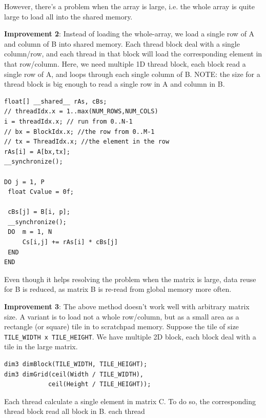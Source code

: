 However, there's a problem when the array is large, i.e. the whole array is
quite large to load all into the shared memory.

{\bf Improvement 2}: Instead of loading the whole-array, we
load a single row of A and column of B into shared memory. Each thread block
deal with a single column/row, and each thread in that block will load the
corresponding element in that row/column. Here, we need multiple 1D
thread block, each block read a single row of A, and loops through each single column of B.
NOTE: the size for a thread block is big enough to read a single row in A and
column in B.
\begin{lstlisting}
float[] __shared__ rAs, cBs;
// threadIdx.x = 1..max(NUM_ROWS,NUM_COLS)
i = threadIdx.x; // run from 0..N-1
// bx = BlockIdx.x; //the row from 0..M-1
// tx = ThreadIdx.x; //the element in the row
rAs[i] = A[bx,tx];
__synchronize();

DO j = 1, P
 float Cvalue = 0f;

 cBs[j] = B[i, p];
 __synchronize();
 DO  m = 1, N
     Cs[i,j] += rAs[i] * cBs[j]
 END
END
\end{lstlisting}
Even though it helps resolving the
problem when the matrix is large, data reuse for B is reduced, as matrix B is
re-read from global memory more often.

{\bf Improvement 3}: The above method doesn't work well with arbitrary matrix
size. A variant is to load not a whole row/column, but as a small area as a
rectangle (or square) tile in to scratchpad memory. Suppose the tile of
size \verb!TILE_WIDTH x TILE_HEIGHT!. We have multiple 2D block, each block deal
with a tile in the large matrix.

\begin{lstlisting}
dim3 dimBlock(TILE_WIDTH, TILE_HEIGHT);
dim3 dimGrid(ceil(Width / TILE_WIDTH),
            ceil(Height / TILE_HEIGHT));
\end{lstlisting}

Each thread calculate a single element in matrix C. To do so, the
corresponding thread block read all block in B.
each thread

